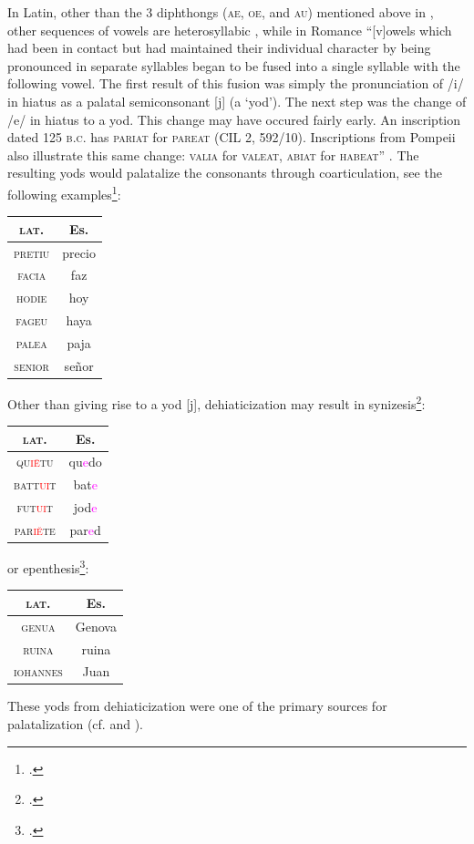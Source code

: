 \documentclass{report}[12pt]
\begin{document}
In Latin, other than the 3 diphthongs (\textsc{ae}, \textsc{oe}, and \textsc{au}) mentioned above in , other sequences of vowels are heterosyllabic \parencite[p.~57]{romance_his}, while in Romance ``[v]owels which had been in contact but had maintained their individual character by being pronounced in separate syllables began to be fused into a single syllable with the following vowel. The first result of this fusion was simply the pronunciation of /i/ in hiatus as a palatal semiconsonant [j] (a `yod'). The next step was the change of /e/ in hiatus to a yod. This change may have occured fairly early. An inscription dated 125 \textsc{b.c.} has \textsc{pariat} for \textsc{pareat} (CIL 2, 592/10). Inscriptions from Pompeii also illustrate this same change: \textsc{valia} for \textsc{valeat}, \textsc{abiat} for \textsc{habeat}'' \parencite[p.~132]{lloyd_spanish}. The resulting yods would palatalize the consonants through coarticulation, see the following examples\footcite[p.~58]{romance_his}:
\begin{center}
  \begin{tabular}{c c}
    \textsc{lat.} & Es. \\
    \hline
    \textsc{pretiu} & precio \\
    \textsc{facia} & faz \\
    \textsc{hodie} & hoy \\
    \textsc{fageu} & haya \\
    \textsc{palea} & paja \\
    \textsc{senior} & se\~{n}or \\
  \end{tabular}
\end{center}
Other than giving rise to a yod [j], dehiaticization may result in synizesis\footcite[p.~57]{romance_his}: 
\begin{center}
  \begin{tabular}{c c}
    \textsc{lat.} & Es. \\
    \hline
    \textsc{qu\textcolor{red}{i\={e}}tu} & qu\textcolor{magenta}{e}do \\
    \textsc{batt\textcolor{red}{ui}t} & bat\textcolor{magenta}{e} \\
    \textsc{fut\textcolor{red}{ui}t} & jod\textcolor{magenta}{e} \\
    \textsc{par\textcolor{red}{i\u{e}}te} & par\textcolor{magenta}{e}d \\
  \end{tabular}
\end{center}
or epenthesis\footcite[p.~57-58]{romance_his}:
\begin{center}
  \begin{tabular}{c c}
    \textsc{lat.} & Es. \\
    \hline
    \textsc{genua} & Genova \\
    \textsc{ruina} & ruina \\
    \textsc{iohannes} & Juan \\
  \end{tabular}
\end{center}
These yods from dehiaticization were one of the primary sources for palatalization (cf.  and ).
\end{document}

